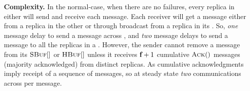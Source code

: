 {\bf Complexity.}
In the normal-case, when there are no failures, every replica in either \RSM{} will send and receive each message.
Each receiver will get a message either from a replica in the other \RSM{} or through broadcast from a replica in its \RSM{}. 
So, {\em one} message delay to send a message across \RSM{}, and {\em two} message delays to send a message to all the replicas in a \RSM{}.
However, the sender cannot remove a message from its $\textsc{SBuf}[{}]$ or $\textsc{HBuf}[{}]$ unless it receives $\textbf{f}_{}+1$ cumulative $\textsc{Ack}()$ messages (majority acknowledged) 
from distinct replicas.
As cumulative acknowledgments imply  receipt of a sequence of messages, so at steady state {\em two} communications across \RSM{} 
per message.






